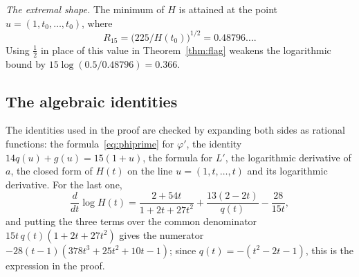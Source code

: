 \documentclass[aps,prd,twocolumn,superscriptaddress,nofootinbib,longbibliography,floatfix,showkeys,amsmath,amssymb,10pt]{revtex4-2}
\theoremstyle{definition}
\theoremstyle{remark}
\begin{document}
\emph{The extremal shape.} The minimum of $H$ is attained at the point
$u=(1,t_0,\dots,t_0)$, where
\[
 R_{15}=\bigl(225/H(t_0)\bigr)^{1/2}=0.48796\ldots .
\]
Using $\frac12$ in place of this value in Theorem~\ref{thm:flag} weakens
the logarithmic bound by $15\log(0.5/0.48796)=0.366$.

\subsection{The algebraic identities}

The identities used in the proof are checked by expanding both sides as
rational functions: the formula~\eqref{eq:phiprime} for $\varphi'$, the
identity $14q(u)+g(u)=15(1+u)$, the formula for $L'$, the logarithmic
derivative of $a$, the closed form of $H(t)$ on the line
$u=(1,t,\dots,t)$ and its logarithmic derivative. For the last one,
\[
 \frac{d}{dt}\log H(t)=\frac{2+54t}{1+2t+27t^2}+\frac{13(2-2t)}{q(t)}
 -\frac{28}{15t},
\]
and putting the three terms over the common denominator
$15t\,q(t)(1+2t+27t^2)$ gives the numerator
$-28(t-1)(378t^3+25t^2+10t-1)$; since $q(t)=-(t^2-2t-1)$, this is the
expression in the proof.
\end{document}
